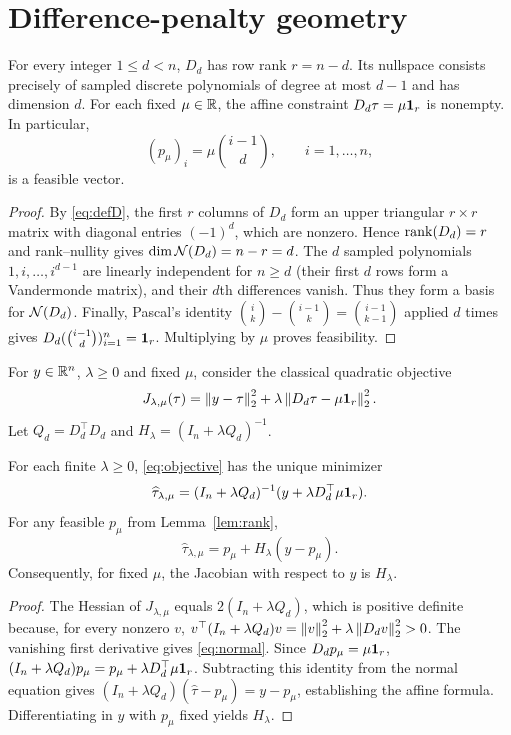\section{Difference-penalty geometry}\label{sec:geometry}

\begin{lemma}\label{lem:rank}
For every integer $1\le d<n$, $D_d$ has row rank $r=n-d$. Its nullspace consists precisely of sampled discrete polynomials of degree at most $d-1$ and has dimension $d$. For each fixed $\mu\in\mathbb R$, the affine constraint $D_d\tau=\mu\mathbf 1_r$ is nonempty. In particular,
\[
(p_\mu)_i=\mu\binom{i-1}{d},\qquad i=1,\ldots,n,
\]
is a feasible vector.
\end{lemma}
\begin{proof}
By \eqref{eq:defD}, the first $r$ columns of $D_d$ form an upper triangular $r\times r$ matrix with diagonal entries $(-1)^d$, which are nonzero. Hence $\operatorname{rank}(D_d)=r$ and rank--nullity gives $\dim\mathcal N(D_d)=n-r=d$. The $d$ sampled polynomials $1,i,\ldots,i^{d-1}$ are linearly independent for $n\ge d$ (their first $d$ rows form a Vandermonde matrix), and their $d$th differences vanish. Thus they form a basis for $\mathcal N(D_d)$. Finally, Pascal's identity $\binom{i}{k}-\binom{i-1}{k}=\binom{i-1}{k-1}$ applied $d$ times gives $D_d(\binom{i-1}{d})_{i=1}^n=\mathbf 1_r$. Multiplying by $\mu$ proves feasibility.
\end{proof}

For $y\in\mathbb R^n$, $\lambda\ge0$ and fixed $\mu$, consider the classical quadratic objective
\begin{equation}\label{eq:objective}
J_{\lambda,\mu}(\tau)
=\left\lVert y-\tau\right\rVert_2^2
+\lambda\left\lVert D_d\tau-\mu\mathbf 1_r\right\rVert_2^2.
\end{equation}
Let $Q_d=D_d^\top D_d$ and $H_\lambda=(I_n+\lambda Q_d)^{-1}$.

\begin{theorem}\label{thm:pls}
For each finite $\lambda\ge0$, \eqref{eq:objective} has the unique minimizer
\begin{equation}\label{eq:normal}
\widehat\tau_{\lambda,\mu}
=(I_n+\lambda Q_d)^{-1}
 (y+\lambda D_d^\top\mu\mathbf 1_r).
\end{equation}
For any feasible $p_\mu$ from Lemma~\ref{lem:rank},
\[
\widehat\tau_{\lambda,\mu}
=p_\mu+H_\lambda(y-p_\mu).
\]
Consequently, for fixed $\mu$, the Jacobian with respect to $y$ is $H_\lambda$.
\end{theorem}
\begin{proof}
The Hessian of $J_{\lambda,\mu}$ equals $2(I_n+\lambda Q_d)$, which is positive definite because, for every nonzero $v$, $v^\top(I_n+\lambda Q_d)v=\left\lVert v\right\rVert_2^2+\lambda\left\lVert D_dv\right\rVert_2^2>0$. The vanishing first derivative gives \eqref{eq:normal}. Since $D_dp_\mu=\mu\mathbf 1_r$, $(I_n+\lambda Q_d)p_\mu=p_\mu+\lambda D_d^\top\mu\mathbf 1_r$. Subtracting this identity from the normal equation gives $(I_n+\lambda Q_d)(\widehat\tau-p_\mu)=y-p_\mu$, establishing the affine formula. Differentiating in $y$ with $p_\mu$ fixed yields $H_\lambda$.
\end{proof}

